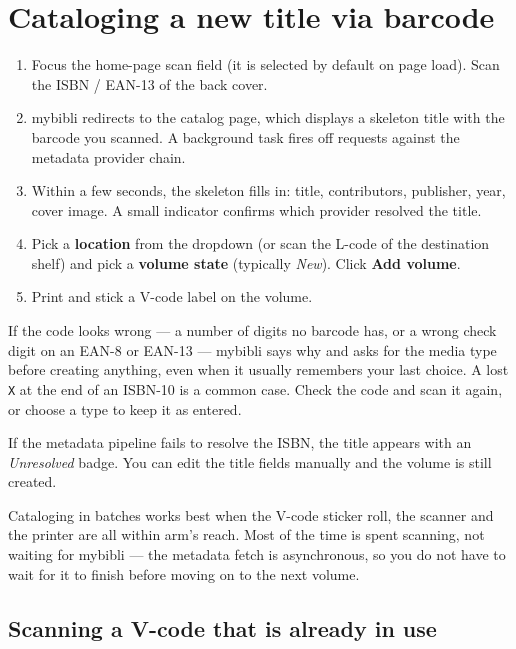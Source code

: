 \section{Cataloging a new title via barcode}\label{sec:catalog-scan}

\begin{enumerate}
  \item Focus the home-page scan field (it is selected by default
        on page load). Scan the ISBN / EAN-13 of the back cover.
  \item mybibli redirects to the catalog page, which displays a
        skeleton title with the barcode you scanned. A background
        task fires off requests against the metadata provider
        chain.
  \item Within a few seconds, the skeleton fills in: title,
        contributors, publisher, year, cover image. A small
        indicator confirms which provider resolved the title.
  \item Pick a \textbf{location} from the dropdown
        (or scan the L-code of the destination shelf) and pick a
        \textbf{volume state} (typically
        \emph{New}). Click \textbf{Add volume}.
  \item Print and stick a V-code label on the volume.
\end{enumerate}

If the code looks wrong --- a number of digits no barcode has, or a
wrong check digit on an EAN-8 or EAN-13 --- mybibli says why and asks for the media type before creating
anything, even when it usually remembers your last choice. A lost
\texttt{X} at the end of an ISBN-10 is a common case. Check the code and
scan it again, or choose a type to keep it as entered.

If the metadata pipeline fails to resolve the ISBN, the title
appears with an \emph{Unresolved} badge. You can edit the title
fields manually and the volume is still created.

\begin{tip}
Cataloging in batches works best when the V-code sticker roll, the
scanner and the printer are all within arm's reach. Most of the time
is spent scanning, not waiting for mybibli — the metadata fetch is
asynchronous, so you do not have to wait for it to finish before
moving on to the next volume.
\end{tip}

\subsection*{Scanning a V-code that is already in use}
\label{sec:scan-existing-vcode}

